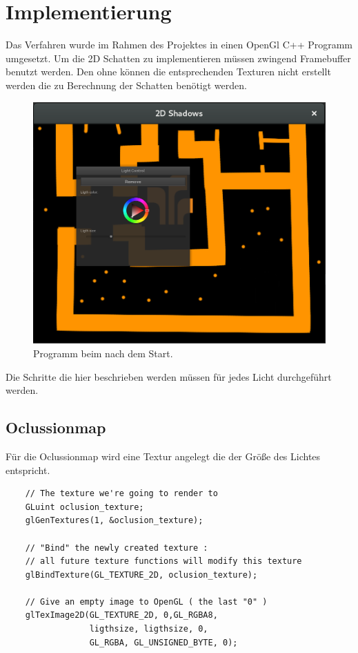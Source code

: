 \chapter{Implementierung}
Das Verfahren wurde im Rahmen des Projektes in einen OpenGl C++ Programm umgesetzt.
Um die 2D Schatten zu implementieren müssen zwingend Framebuffer benutzt werden.
Den ohne können die entsprechenden Texturen nicht erstellt werden die zu Berechnung der Schatten benötigt werden. 
\begin{figure}
	\centering
	\includegraphics[scale=0.25]{images/Bildschirmfoto_1.png}
	\caption{Programm beim nach dem Start.}
	\label{p_1}
\end{figure}

Die Schritte die hier beschrieben werden müssen für jedes Licht durchgeführt werden.

\section{Oclussionmap}

Für die Oclussionmap wird eine Textur angelegt die der Größe des Lichtes entspricht.
\begin{lstlisting}
	// The texture we're going to render to
	GLuint oclusion_texture;
	glGenTextures(1, &oclusion_texture);
	
	// "Bind" the newly created texture : 
	// all future texture functions will modify this texture
	glBindTexture(GL_TEXTURE_2D, oclusion_texture);
	
	// Give an empty image to OpenGL ( the last "0" )
	glTexImage2D(GL_TEXTURE_2D, 0,GL_RGBA8,
				 ligthsize, ligthsize, 0,
				 GL_RGBA, GL_UNSIGNED_BYTE, 0);
\end{lstlisting}

